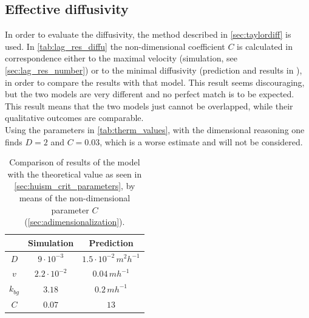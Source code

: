 \subsection{Effective diffusivity}
In order to evaluate the diffusivity, the method described in \autoref{sec:taylordiff} is used. %
In \autoref{tab:lag_res_diffu} the non-dimensional coefficient $C$ is calculated in correspondence either to the maximal velocity (simulation, see \autoref{sec:lag_res_number}) or to the minimal diffusivity (prediction and results in \autocite{Huisman2002HowPersist}), in order to compare the results with that model. 
This result seems discouraging, but the two models are very different and no perfect match is to be expected. This result means that the two models just cannot be overlapped, while their qualitative outcomes are comparable.\\
Using the parameters in \autoref{tab:therm_values}, with the dimensional reasoning one finds $D=2$ and $C=0.03$, which is a worse estimate and will not be considered.

\begin{table}
    \centering
    \begin{tabular}{ c || c | c }
        & Simulation & Prediction \\
        \hline
        $D$
            & $9\cdot10^{-3}$ 
            & $1.5\cdot10^{-2}\,m^2h^{-1}$ \\
        $v$
            & $2.2\cdot10^{-2}$
            & $0.04\,mh^{-1}$ \\
        $k_{bg}$ 
            & $3.18$ 
            & $0.2\,mh^{-1}$ \\
        $C$ 
            & $0.07$ & $13$ \\   
    \end{tabular}
    \caption{Comparison of results of the model with the theoretical value as seen in \autoref{sec:huism_crit_parameters}, by means of the non-dimensional parameter $C$ (\autoref{sec:adimensionalization}).} %
    \label{tab:lag_res_diffu}
\end{table}

